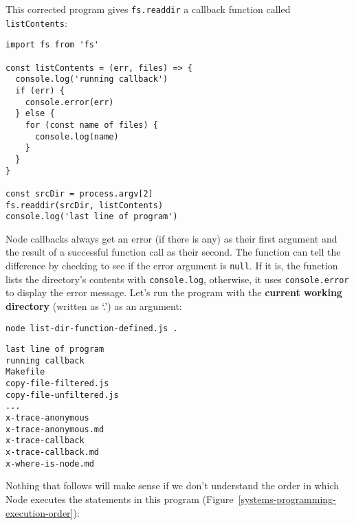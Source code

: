 \documentclass[krantzl]{krantz}
\newcommand{\figref}[1]{Figure~\ref{#1}}
\newcommand{\glossref}[1]{\textbf{#1}}
\begin{document}
This corrected program gives \texttt{fs.readdir} a callback function called \texttt{listContents}:


\begin{lstlisting}[frame=tblr]
import fs from 'fs'

const listContents = (err, files) => {
  console.log('running callback')
  if (err) {
    console.error(err)
  } else {
    for (const name of files) {
      console.log(name)
    }
  }
}

const srcDir = process.argv[2]
fs.readdir(srcDir, listContents)
console.log('last line of program')
\end{lstlisting}



\noindent Node callbacks
always get an error (if there is any) as their first argument
and the result of a successful function call as their second.
The function can tell the difference by checking to see if the error argument is \texttt{null}.
If it is, the function lists the directory’s contents with \texttt{console.log},
otherwise, it uses \texttt{console.error} to display the error message.
Let’s run the program with the \glossref{current working directory}
(written as ‘.’)
as an argument:


\begin{lstlisting}[frame=shadowbox]
node list-dir-function-defined.js .
\end{lstlisting}



\begin{lstlisting}[frame=tblr,backgroundcolor=\color{black!5}]
last line of program
running callback
Makefile
copy-file-filtered.js
copy-file-unfiltered.js
...
x-trace-anonymous
x-trace-anonymous.md
x-trace-callback
x-trace-callback.md
x-where-is-node.md
\end{lstlisting}



Nothing that follows will make sense if we don’t understand
the order in which Node executes the statements in this program
(\figref{systems-programming-execution-order}):
\end{document}
